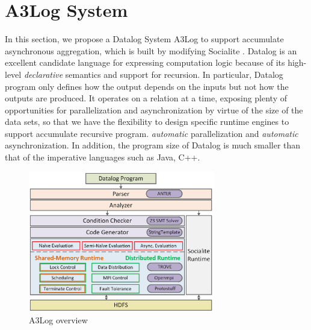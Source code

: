 \section{A3Log System}
\label{sec:system}

In this section, we propose a Datalog System A3Log to support accumulate asynchronous aggregation, which is built by modifying Socialite \cite{Lam:2013:SDE:2510649.2511289,Seo:2013:DSD:2556549.2556572}. Datalog is an excellent candidate language for expressing computation logic because of its high-level \emph{declarative} semantics and support for recursion. In particular, Datalog program only defines how the output depends on the inputs but not how the outputs are produced. It operates on a relation at a time, exposing plenty of opportunities for parallelization and asynchronization by virtue of the size of the data sets, so that we have the flexibility to design specific runtime engines to support accumulate recursive program. \emph{automatic} parallelization and \emph{automatic} asynchronization. In addition, the program size of Datalog is much smaller than that of the imperative languages such as Java, C++. %

\begin{figure}[!t]
	\centering
	\includegraphics[width=3.2in]{fig/overview2}
	\vspace{-0.1in}
	\caption{A3Log overview}
	\label{fig:overview}
	\vspace{-0.2in}
\end{figure}

